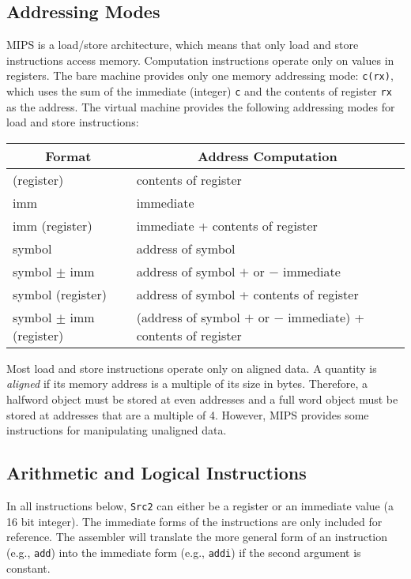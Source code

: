 \documentclass[11pt]{article}
\begin{document}
\subsection {Addressing Modes}

MIPS is a load/store architecture, which means that only load and
store instructions access memory.  Computation instructions operate
only on values in registers.  The bare machine provides only one
memory addressing mode: {\tt c(rx)}, which uses the sum of the
immediate (integer) {\tt c} and the contents of register {\tt rx} as
the address.  The virtual machine provides the following addressing
modes for load and store instructions:
\begin{center}
  \small
  \begin{tabular}{|l|l|}
    \hline
    \multicolumn{1}{|c|}{\bf Format} &
	\multicolumn{1}{|c|}{\bf Address Computation} \\
    \hline
    \hline
    (register) &  contents of register \\
    imm & immediate \\
    imm (register) & immediate + contents of register \\
    symbol & address of symbol \\
    symbol $\pm$ imm & address of symbol $+$ or $-$ immediate \\
    symbol (register) & address of symbol + contents of register \\
    symbol $\pm$ imm (register) & (address of symbol $+$ or $-$ immediate) + contents of register \\
    \hline
  \end{tabular}
\end{center}

Most load and store instructions operate only on aligned data.  A
quantity is {\em aligned\/} if its memory address is a multiple of its
size in bytes.  Therefore, a halfword object must be stored at even
addresses and a full word object must be stored at addresses that are
a multiple of 4.  However, MIPS provides some instructions for
manipulating unaligned data.

\subsection {Arithmetic and Logical Instructions}

In all instructions below, {\tt Src2} can either be a register or an
immediate value (a 16 bit integer). The immediate forms of the
instructions are only included for reference.  The assembler will
translate the more general form of an instruction (e.g., {\tt add})
into the immediate form (e.g., {\tt addi}) if the second argument is
constant.
\end{document}
